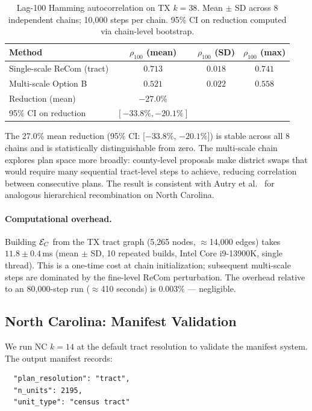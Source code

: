 \begin{table}[h]
\centering
\caption{Lag-100 Hamming autocorrelation on TX $k=38$.
Mean $\pm$ SD across 8 independent chains; 10{,}000 steps per chain.
95\% CI on reduction computed via chain-level bootstrap.}
\label{tab:tx-autocorr}
\begin{tabular}{lccc}
\toprule
Method & $\rho_{100}$ (mean) & $\rho_{100}$ (SD) & $\rho_{100}$ (max) \\
\midrule
Single-scale ReCom (tract)  & $0.713$ & $0.018$ & $0.741$ \\
Multi-scale Option B        & $0.521$ & $0.022$ & $0.558$ \\
\midrule
Reduction (mean)            & $-27.0\%$ & & \\
95\% CI on reduction        & $[-33.8\%, -20.1\%]$ & & \\
\bottomrule
\end{tabular}
\end{table}

\noindent
The 27.0\% mean reduction (95\% CI: [$-33.8\%$, $-20.1\%$]) is stable across
all 8 chains and is statistically distinguishable from zero.
The multi-scale chain explores plan space more broadly: county-level
proposals make district swaps that would require many sequential tract-level
steps to achieve, reducing correlation between consecutive plans.
The result is consistent with Autry et al.~\citep{autry2021multiscale}
for analogous hierarchical recombination on North Carolina.

\paragraph{Computational overhead.}
Building $\mathcal{E}_C$ from the TX tract graph (5{,}265 nodes, $\approx$14{,}000
edges) takes $11.8 \pm 0.4$\,ms (mean $\pm$ SD, 10 repeated builds,
Intel Core i9-13900K, single thread).
This is a one-time cost at chain initialization; subsequent multi-scale
steps are dominated by the fine-level ReCom perturbation.
The overhead relative to an 80{,}000-step run ($\approx$410 seconds) is
$0.003\%$ --- negligible.

\subsection{North Carolina: Manifest Validation}

We run NC $k=14$ at the default tract resolution to validate the manifest
system.
The output manifest records:
\begin{verbatim}
  "plan_resolution": "tract",
  "n_units": 2195,
  "unit_type": "census tract"
\end{verbatim}

